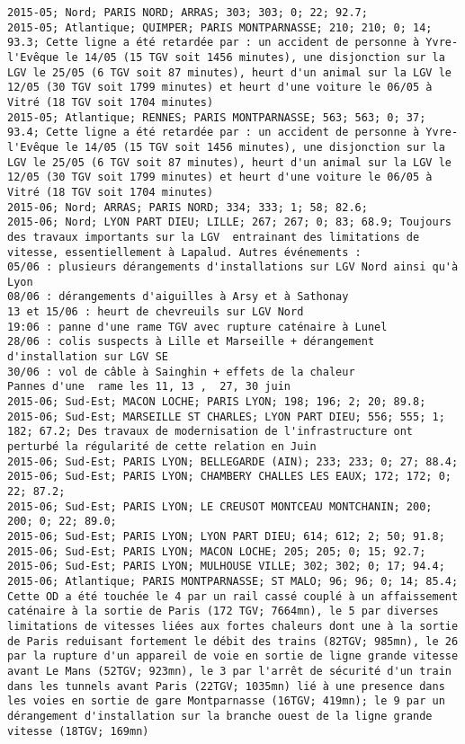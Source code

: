 \documentclass{article}
\begin{document}
\begin{Verbatim}[commandchars=\\\{\}]
2015-05; Nord; PARIS NORD; ARRAS; 303; 303; 0; 22; 92.7; 
2015-05; Atlantique; QUIMPER; PARIS MONTPARNASSE; 210; 210; 0; 14; 93.3; Cette ligne a été retardée par : un accident de personne à Yvre-l'Evêque le 14/05 (15 TGV soit 1456 minutes), une disjonction sur la LGV le 25/05 (6 TGV soit 87 minutes), heurt d'un animal sur la LGV le 12/05 (30 TGV soit 1799 minutes) et heurt d'une voiture le 06/05 à Vitré (18 TGV soit 1704 minutes)
2015-05; Atlantique; RENNES; PARIS MONTPARNASSE; 563; 563; 0; 37; 93.4; Cette ligne a été retardée par : un accident de personne à Yvre-l'Evêque le 14/05 (15 TGV soit 1456 minutes), une disjonction sur la LGV le 25/05 (6 TGV soit 87 minutes), heurt d'un animal sur la LGV le 12/05 (30 TGV soit 1799 minutes) et heurt d'une voiture le 06/05 à Vitré (18 TGV soit 1704 minutes)
2015-06; Nord; ARRAS; PARIS NORD; 334; 333; 1; 58; 82.6; 
2015-06; Nord; LYON PART DIEU; LILLE; 267; 267; 0; 83; 68.9; Toujours des travaux importants sur la LGV  entrainant des limitations de vitesse, essentiellement à Lapalud. Autres événements :
05/06 : plusieurs dérangements d'installations sur LGV Nord ainsi qu'à Lyon
08/06 : dérangements d'aiguilles à Arsy et à Sathonay 
13 et 15/06 : heurt de chevreuils sur LGV Nord
19:06 : panne d'une rame TGV avec rupture caténaire à Lunel
28/06 : colis suspects à Lille et Marseille + dérangement d'installation sur LGV SE
30/06 : vol de câble à Sainghin + effets de la chaleur
Pannes d'une  rame les 11, 13 ,  27, 30 juin
2015-06; Sud-Est; MACON LOCHE; PARIS LYON; 198; 196; 2; 20; 89.8; 
2015-06; Sud-Est; MARSEILLE ST CHARLES; LYON PART DIEU; 556; 555; 1; 182; 67.2; Des travaux de modernisation de l'infrastructure ont perturbé la régularité de cette relation en Juin
2015-06; Sud-Est; PARIS LYON; BELLEGARDE (AIN); 233; 233; 0; 27; 88.4; 
2015-06; Sud-Est; PARIS LYON; CHAMBERY CHALLES LES EAUX; 172; 172; 0; 22; 87.2; 
2015-06; Sud-Est; PARIS LYON; LE CREUSOT MONTCEAU MONTCHANIN; 200; 200; 0; 22; 89.0; 
2015-06; Sud-Est; PARIS LYON; LYON PART DIEU; 614; 612; 2; 50; 91.8; 
2015-06; Sud-Est; PARIS LYON; MACON LOCHE; 205; 205; 0; 15; 92.7; 
2015-06; Sud-Est; PARIS LYON; MULHOUSE VILLE; 302; 302; 0; 17; 94.4; 
2015-06; Atlantique; PARIS MONTPARNASSE; ST MALO; 96; 96; 0; 14; 85.4; Cette OD a été touchée le 4 par un rail cassé couplé à un affaissement caténaire à la sortie de Paris (172 TGV; 7664mn), le 5 par diverses limitations de vitesses liées aux fortes chaleurs dont une à la sortie de Paris reduisant fortement le débit des trains (82TGV; 985mn), le 26 par la rupture d'un appareil de voie en sortie de ligne grande vitesse avant Le Mans (52TGV; 923mn), le 3 par l'arrêt de sécurité d'un train dans les tunnels avant Paris (22TGV; 1035mn) lié à une presence dans les voies en sortie de gare Montparnasse (16TGV; 419mn); le 9 par un dérangement d'installation sur la branche ouest de la ligne grande vitesse (18TGV; 169mn)

\end{Verbatim}
\end{document}
